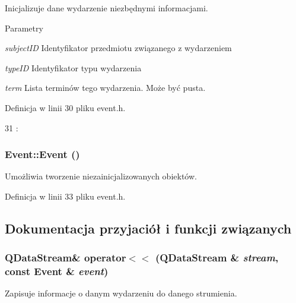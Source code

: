 Inicjalizuje dane wydarzenie niezbędnymi informacjami. 


\begin{DoxyParams}{Parametry}
\item[{\em subjectID}]Identyfikator przedmiotu związanego z wydarzeniem \item[{\em typeID}]Identyfikator typu wydarzenia \item[{\em term}]Lista terminów tego wydarzenia. Może być pusta. \end{DoxyParams}


Definicja w linii 30 pliku event.h.




\begin{DoxyCode}
31 :\end{DoxyCode}


\hypertarget{classEvent_a5a40dd4708297f7031e29b39e039ae10}{
\subsubsection[{Event}]{\setlength{\rightskip}{0pt plus 5cm}Event::Event ()}}
\label{classEvent_a5a40dd4708297f7031e29b39e039ae10}


Umożliwia tworzenie niezainicjalizowanych obiektów. 



Definicja w linii 33 pliku event.h.



\subsection{Dokumentacja przyjaciół i funkcji związanych}
\hypertarget{classEvent_a62e8730ab4dc16e3d456b527a12635b3}{
\subsubsection[{operator$<$$<$}]{\setlength{\rightskip}{0pt plus 5cm}QDataStream\& operator$<$$<$ (QDataStream \& {\em stream}, \/  const {\bf Event} \& {\em event})}}
\label{classEvent_a62e8730ab4dc16e3d456b527a12635b3}


Zapisuje informacje o danym wydarzeniu do danego strumienia. 


